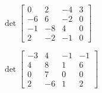 \begin{exercise}
\begin{Parts}
\item \(\det\begin{bmatrix} 0 & 2 & -4 & 3
\\-6 & 6 & -2 & 0
\\-1 & -8 & 4 & 0
\\2 & -2 & -1 & 0 \end{bmatrix}\)

\item \(\det\begin{bmatrix} -3 & 4 & -1 & -1
\\4 & 8 & 1 & 6
\\0 & 7 & 0 & 0
\\2 & -6 & 1 & 2 \end{bmatrix}\)

\end{Parts}
\end{exercise}




